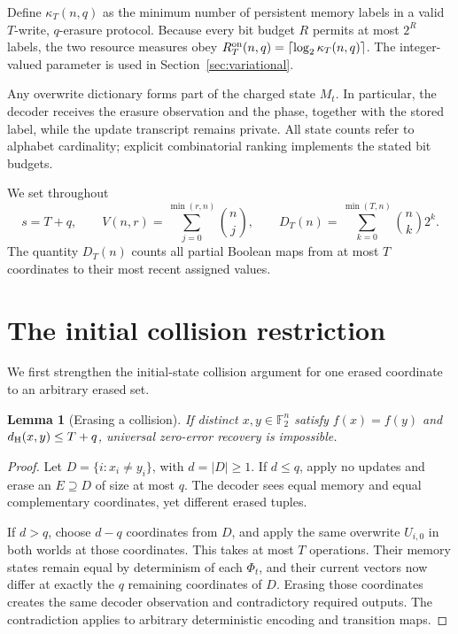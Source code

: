 \documentclass[11pt,a4paper]{article}
\newtheorem{lemma}[theorem]{Lemma}
\newcommand{\F}{\mathbb F_2}
\newcommand{\dist}{d_{\rm H}}
\begin{document}
Define $\kappa_T(n,q)$ as the minimum number of persistent memory labels in a valid $T$-write, $q$-erasure protocol. Because every bit budget $R$ permits at most $2^R$ labels, the two resource measures obey $R_T^{\rm on}(n,q)=\lceil\log_2\kappa_T(n,q)\rceil$. The integer-valued parameter is used in Section~\ref{sec:variational}.

Any overwrite dictionary forms part of the charged state $M_t$. In particular, the decoder receives the erasure observation and the phase, together with the stored label, while the update transcript remains private. All state counts refer to alphabet cardinality; explicit combinatorial ranking implements the stated bit budgets.

We set throughout
\[
 s=T+q,\qquad V(n,r)=\sum_{j=0}^{\min(r,n)}\binom nj,\qquad D_T(n)=\sum_{k=0}^{\min(T,n)}\binom nk2^k.
\]
The quantity $D_T(n)$ counts all partial Boolean maps from at most $T$ coordinates to their most recent assigned values.

\section{The initial collision restriction}
We first strengthen the initial-state collision argument for one erased coordinate to an arbitrary erased set.

\begin{lemma}[Erasing a collision]\label{lem:collision}
If distinct $x,y\in\F^n$ satisfy $f(x)=f(y)$ and $\dist(x,y)\le T+q$, universal zero-error recovery is impossible.
\end{lemma}
\begin{proof}
Let $D=\{i:x_i\ne y_i\}$, with $d=|D|\ge1$. If $d\le q$, apply no updates and erase an $E\supseteq D$ of size at most $q$. The decoder sees equal memory and equal complementary coordinates, yet different erased tuples.

If $d>q$, choose $d-q$ coordinates from $D$, and apply the same overwrite $U_{i,0}$ in both worlds at those coordinates. This takes at most $T$ operations. Their memory states remain equal by determinism of each $\Phi_t$, and their current vectors now differ at exactly the $q$ remaining coordinates of $D$. Erasing those coordinates creates the same decoder observation and contradictory required outputs. The contradiction applies to arbitrary deterministic encoding and transition maps.
\end{proof}
\end{document}
